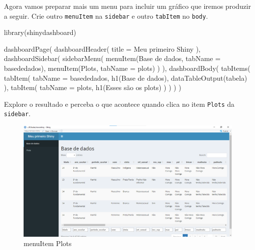 \documentclass[
]{book}
\newenvironment{Shaded}{\begin{snugshade}}{\end{snugshade}}
\newcommand{\AttributeTok}[1]{\textcolor[rgb]{0.77,0.63,0.00}{#1}}
\newcommand{\FunctionTok}[1]{\textcolor[rgb]{0.00,0.00,0.00}{#1}}
\newcommand{\NormalTok}[1]{#1}
\newcommand{\StringTok}[1]{\textcolor[rgb]{0.31,0.60,0.02}{#1}}
\begin{document}
Agora vamos preparar mais um menu para incluir um gráfico que iremos produzir a seguir. Crie outro \texttt{menuItem} na \texttt{sidebar} e outro \texttt{tabItem} no \texttt{body}.

\begin{Shaded}
\begin{Highlighting}[]
\FunctionTok{library}\NormalTok{(shinydashboard)}

\FunctionTok{dashboardPage}\NormalTok{(}
  \FunctionTok{dashboardHeader}\NormalTok{(}
    \AttributeTok{title =} \StringTok{\textquotesingle{}Meu primeiro Shiny\textquotesingle{}}
\NormalTok{  ),}
  \FunctionTok{dashboardSidebar}\NormalTok{(}
    \FunctionTok{sidebarMenu}\NormalTok{(}
      \FunctionTok{menuItem}\NormalTok{(}\StringTok{\textquotesingle{}Base de dados\textquotesingle{}}\NormalTok{, }\AttributeTok{tabName =} \StringTok{\textquotesingle{}basededados\textquotesingle{}}\NormalTok{),}
      \FunctionTok{menuItem}\NormalTok{(}\StringTok{\textquotesingle{}Plots\textquotesingle{}}\NormalTok{, }\AttributeTok{tabName =} \StringTok{\textquotesingle{}plots\textquotesingle{}}\NormalTok{)}
\NormalTok{    )}
\NormalTok{  ),}
  \FunctionTok{dashboardBody}\NormalTok{(}
    \FunctionTok{tabItems}\NormalTok{(}
      \FunctionTok{tabItem}\NormalTok{(}
        \AttributeTok{tabName =} \StringTok{\textquotesingle{}basededados\textquotesingle{}}\NormalTok{,}
        \FunctionTok{h1}\NormalTok{(}\StringTok{\textquotesingle{}Base de dados\textquotesingle{}}\NormalTok{),}
        \FunctionTok{dataTableOutput}\NormalTok{(}\StringTok{\textquotesingle{}tabela\textquotesingle{}}\NormalTok{)}
\NormalTok{      ),}
      \FunctionTok{tabItem}\NormalTok{(}
        \AttributeTok{tabName =} \StringTok{\textquotesingle{}plots\textquotesingle{}}\NormalTok{,}
        \FunctionTok{h1}\NormalTok{(}\StringTok{\textquotesingle{}Esses são os plots\textquotesingle{}}\NormalTok{)}
\NormalTok{      )}
\NormalTok{    )}
\NormalTok{  )}
\NormalTok{)}
\end{Highlighting}
\end{Shaded}

Explore o resultado e perceba o que acontece quando clica no item \texttt{Plots} da \texttt{sidebar}.

\begin{figure}
\centering
\includegraphics{./imagens/cap10imagem14.png}
\caption{menuItem Plots}
\end{figure}

  
\end{document}
